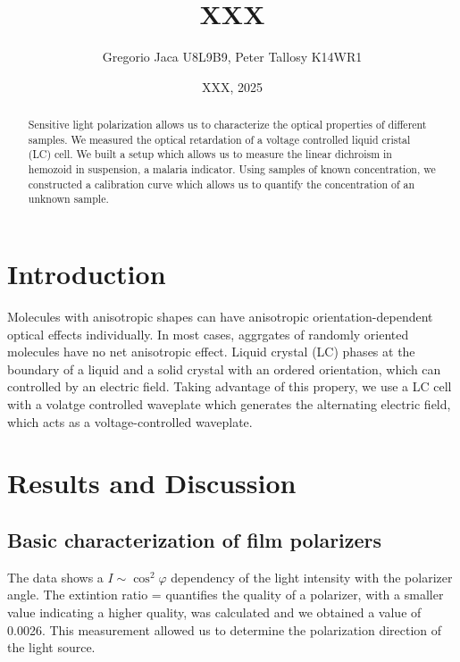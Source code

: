 \documentclass[12pt,a4paper]{article}
\title{XXX}
\author{Gregorio Jaca U8L9B9, Peter Tallosy K14WR1 }
\date{XXX, 2025}
\begin{document}
\maketitle

\begin{abstract}

    Sensitive light polarization allows us to characterize the optical properties of different samples.
    We measured the optical retardation of a voltage controlled liquid cristal (LC) cell. We built a setup which allows us to measure the linear dichroism in hemozoid in suspension, a malaria indicator. Using samples of known concentration, we constructed a calibration curve which allows us to quantify the concentration of an unknown sample.

\end{abstract}

\section{Introduction}

Molecules with anisotropic shapes can have anisotropic orientation-dependent optical effects individually. In most cases, aggrgates of randomly oriented molecules have no net anisotropic effect. Liquid crystal (LC) phases at the boundary of a liquid and a solid crystal with an ordered orientation, which can controlled by an electric field. Taking advantage of this propery, we use a LC cell with a volatge controlled waveplate which generates the alternating electric field, which acts as a voltage-controlled waveplate.


\section{Results and Discussion}

\subsection{Basic characterization of film polarizers}


The data shows a $I \sim \cos^2\varphi$ dependency of the light intensity with the polarizer angle. The extintion ratio =  quantifies the quality of a polarizer, with a smaller value indicating a higher quality, was calculated and we obtained a value of 0.0026. This measurement allowed us to determine the polarization direction of the light source.
\end{document}
